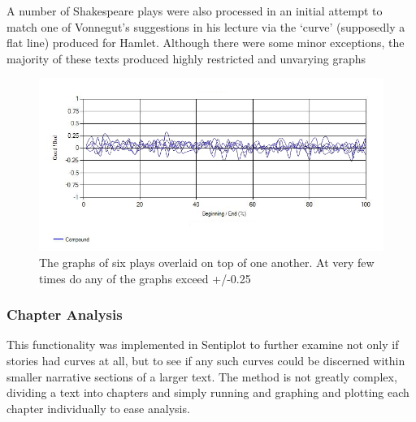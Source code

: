 \documentclass{article}
\begin{document}
            A number of Shakespeare plays were also processed in an initial attempt to match one of Vonnegut's suggestions in his lecture via the `curve' (supposedly a flat line) produced for Hamlet. Although there were some minor exceptions, the majority of these texts produced highly restricted and unvarying graphs
            \begin{figure}
                \includegraphics[width=1\textwidth]{Figures/Curve/ShakespeareOverlaid}
                \centering
                \caption{The graphs of six plays overlaid on top of one another. At very few times do any of the graphs exceed +/-0.25} 
                \label{fig:ShakespearOverlaid}
            \end{figure}
        \subsubsection{Chapter Analysis}
            This functionality was implemented in Sentiplot to further examine not only if stories had curves at all, but to see if any such curves could be discerned within smaller narrative sections of a larger text. The method is not greatly complex, dividing a text into chapters and simply running and graphing and plotting each chapter individually to ease analysis.
\end{document}
